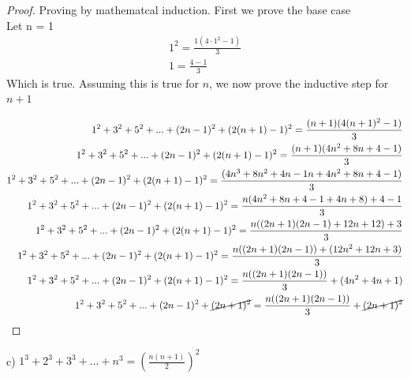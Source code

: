 \documentclass[]{report}
\begin{document}
\begin{proof}
	Proving by mathematcal induction.
	First we prove the base case\\
	Let n = 1
	\begin{align*}
		1^2 = \frac{1(4\cdot 1^2 - 1)}{3} \\
		1 = \frac{4 -1}{3}
	\end{align*}
	Which is true. Assuming this is true for $n$, we now prove the inductive step for $n+1$
	
	\begin{align*}
		1^2 + 3^2 + 5^2 + ...  +(2n - 1)^2 +(2(n+1) - 1)^2 = \frac{(n+1)(4(n+1)^2 -1)}{3}\\
		1^2 + 3^2 + 5^2 + ...  +(2n - 1)^2 +(2(n+1) - 1)^2 = \frac{(n+1)(4n^2 + 8n + 4 -1)}{3}\\
		1^2 + 3^2 + 5^2 + ...  +(2n - 1)^2 +(2(n+1) - 1)^2 = \frac{(4n^3 + 8n^2 + 4n -1n + 4n^2 + 8n + 4 - 1)}{3}\\
		1^2 + 3^2 + 5^2 + ...  +(2n - 1)^2 +(2(n+1) - 1)^2 = \frac{n(4n^2 + 8n + 4 -1 + 4n + 8) + 4 - 1}{3}\\
		1^2 + 3^2 + 5^2 + ...  +(2n - 1)^2 +(2(n+1) - 1)^2 = \frac{n((2n+1)(2n-1) + 12n + 12) + 3}{3}\\
		1^2 + 3^2 + 5^2 + ...  +(2n - 1)^2 +(2(n+1) - 1)^2 = \frac{n((2n+1)(2n-1)) + (12n^2 + 12n + 3)}{3}\\
		1^2 + 3^2 + 5^2 + ...  +(2n - 1)^2 +(2(n+1) - 1)^2 = \frac{n((2n+1)(2n-1))}{3} + (4n^2 + 4n + 1)\\
		1^2 + 3^2 + 5^2 + ...  +(2n - 1)^2 +\cancel{(2n+1)^2} = \frac{n((2n+1)(2n-1))}{3} + \cancel{(2n + 1)^2}\\
	\end{align*}
\end{proof}

c) $1^3 + 2^3 + 3^3 + ... + n^3 = (\frac{n(n+1)}{2})^2$
\end{document}
